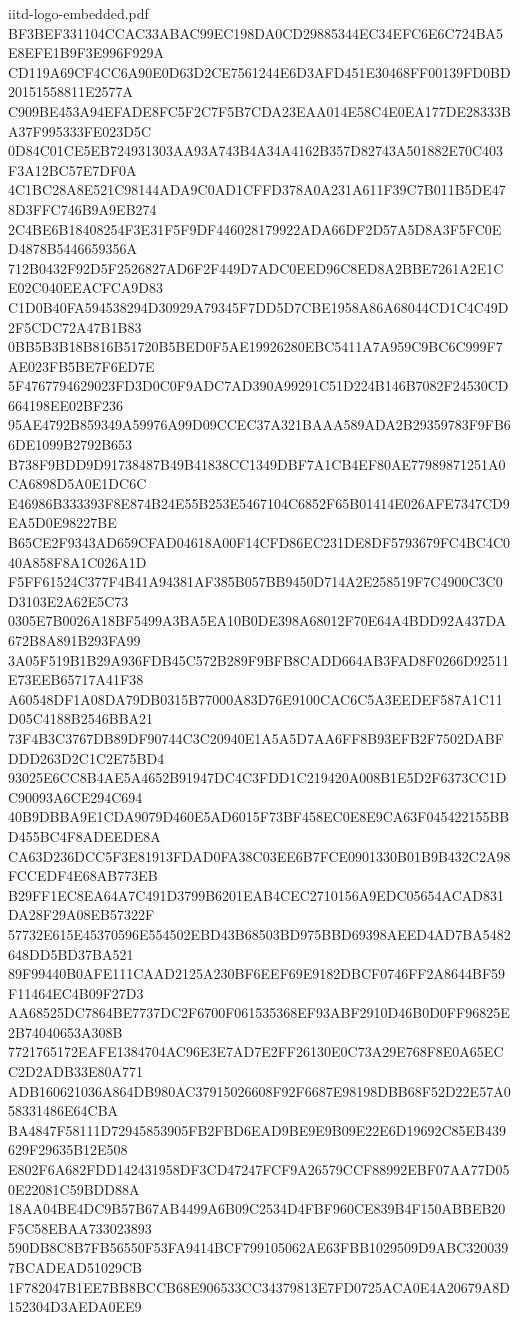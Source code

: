 \begin{filecontents*}[overwrite]{iitd-logo-embedded.pdf}
BF3BEF331104CCAC33ABAC99EC198DA0CD29885344EC34EFC6E6C724BA5E8EFE1B9F3E996F929A
CD119A69CF4CC6A90E0D63D2CE7561244E6D3AFD451E30468FF00139FD0BD20151558811E2577A
C909BE453A94EFADE8FC5F2C7F5B7CDA23EAA014E58C4E0EA177DE28333BA37F995333FE023D5C
0D84C01CE5EB724931303AA93A743B4A34A4162B357D82743A501882E70C403F3A12BC57E7DF0A
4C1BC28A8E521C98144ADA9C0AD1CFFD378A0A231A611F39C7B011B5DE478D3FFC746B9A9EB274
2C4BE6B18408254F3E31F5F9DF446028179922ADA66DF2D57A5D8A3F5FC0ED4878B5446659356A
712B0432F92D5F2526827AD6F2F449D7ADC0EED96C8ED8A2BBE7261A2E1CE02C040EEACFCA9D83
C1D0B40FA594538294D30929A79345F7DD5D7CBE1958A86A68044CD1C4C49D2F5CDC72A47B1B83
0BB5B3B18B816B51720B5BED0F5AE19926280EBC5411A7A959C9BC6C999F7AE023FB5BE7F6ED7E
5F4767794629023FD3D0C0F9ADC7AD390A99291C51D224B146B7082F24530CD664198EE02BF236
95AE4792B859349A59976A99D09CCEC37A321BAAA589ADA2B29359783F9FB66DE1099B2792B653
B738F9BDD9D91738487B49B41838CC1349DBF7A1CB4EF80AE77989871251A0CA6898D5A0E1DC6C
E46986B333393F8E874B24E55B253E5467104C6852F65B01414E026AFE7347CD9EA5D0E98227BE
B65CE2F9343AD659CFAD04618A00F14CFD86EC231DE8DF5793679FC4BC4C040A858F8A1C026A1D
F5FF61524C377F4B41A94381AF385B057BB9450D714A2E258519F7C4900C3C0D3103E2A62E5C73
0305E7B0026A18BF5499A3BA5EA10B0DE398A68012F70E64A4BDD92A437DA672B8A891B293FA99
3A05F519B1B29A936FDB45C572B289F9BFB8CADD664AB3FAD8F0266D92511E73EEB65717A41F38
A60548DF1A08DA79DB0315B77000A83D76E9100CAC6C5A3EEDEF587A1C11D05C4188B2546BBA21
73F4B3C3767DB89DF90744C3C20940E1A5A5D7AA6FF8B93EFB2F7502DABFDDD263D2C1C2E75BD4
93025E6CC8B4AE5A4652B91947DC4C3FDD1C219420A008B1E5D2F6373CC1DC90093A6CE294C694
40B9DBBA9E1CDA9079D460E5AD6015F73BF458EC0E8E9CA63F045422155BBD455BC4F8ADEEDE8A
CA63D236DCC5F3E81913FDAD0FA38C03EE6B7FCE0901330B01B9B432C2A98FCCEDF4E68AB773EB
B29FF1EC8EA64A7C491D3799B6201EAB4CEC2710156A9EDC05654ACAD831DA28F29A08EB57322F
57732E615E45370596E554502EBD43B68503BD975BBD69398AEED4AD7BA5482648DD5BD37BA521
89F99440B0AFE111CAAD2125A230BF6EEF69E9182DBCF0746FF2A8644BF59F11464EC4B09F27D3
AA68525DC7864BE7737DC2F6700F061535368EF93ABF2910D46B0D0FF96825E2B74040653A308B
7721765172EAFE1384704AC96E3E7AD7E2FF26130E0C73A29E768F8E0A65ECC2D2ADB33E80A771
ADB160621036A864DB980AC37915026608F92F6687E98198DBB68F52D22E57A058331486E64CBA
BA4847F58111D72945853905FB2FBD6EAD9BE9E9B09E22E6D19692C85EB439629F29635B12E508
E802F6A682FDD142431958DF3CD47247FCF9A26579CCF88992EBF07AA77D050E22081C59BDD88A
18AA04BE4DC9B57B67AB4499A6B09C2534D4FBF960CE839B4F150ABBEB20F5C58EBAA733023893
590DB8C8B7FB56550F53FA9414BCF799105062AE63FBB1029509D9ABC3200397BCADEAD51029CB
1F782047B1EE7BB8BCCB68E906533CC34379813E7FD0725ACA0E4A20679A8D152304D3AEDA0EE9

\end{filecontents*}
